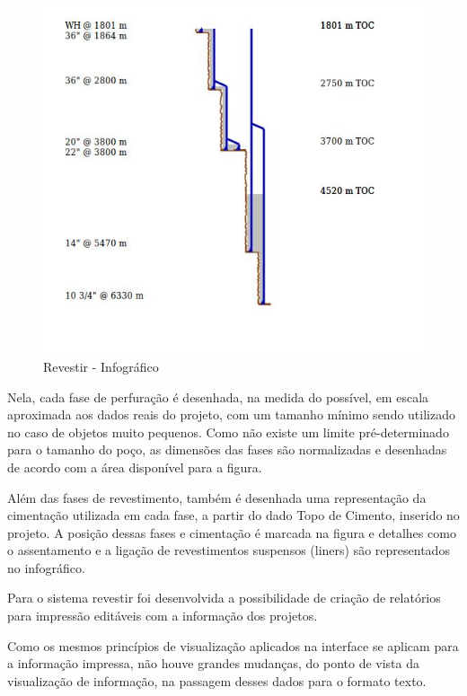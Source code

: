 \documentclass[]{article}
\begin{document}
\begin{figure}[!ht]
\centering
\includegraphics[scale=.5]{./s3p-infografico}
\caption[]{Revestir - Infográfico}
\label{fig:s3p-infografico}
\end{figure}

Nela, cada fase de perfuração é desenhada, na medida do possível, em escala aproximada aos dados reais do projeto, com um tamanho mínimo sendo utilizado no caso de objetos muito pequenos. Como não existe um limite pré-determinado para o tamanho do poço, as dimensões das  fases são normalizadas e desenhadas de acordo com a área disponível para a figura.

Além das fases de revestimento, também é desenhada uma representação da cimentação utilizada em cada fase, a partir do dado Topo de Cimento, inserido no projeto. A posição dessas fases e cimentação é marcada na figura e detalhes como o assentamento e a ligação de revestimentos suspensos (liners) são representados no infográfico.

Para o sistema revestir foi desenvolvida a possibilidade de criação de relatórios para impressão editáveis com a informação dos projetos. 

Como os mesmos princípios de visualização aplicados na interface se aplicam para a informação impressa, não houve grandes mudanças, do ponto de vista da visualização de informação, na passagem desses dados para o formato texto. 
\end{document}
